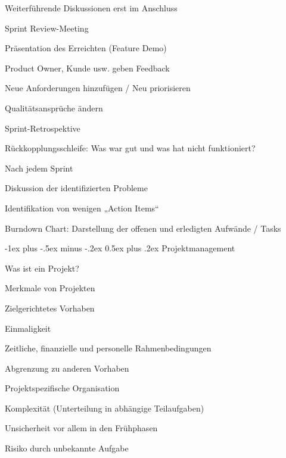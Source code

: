 \documentclass[a4paper]{article}
\makeatletter
\renewcommand{\section}{\@startsection{section}{1}{0mm}%
                                {-1ex plus -.5ex minus -.2ex}%
                                {0.5ex plus .2ex}%
                                {\normalfont\large\bfseries}}
\makeatother
\begin{document}
\begin{multicols}{3}
\begin{itemize*}
\begin{itemize*}
      \item Weiterführende Diskussionen erst im Anschluss
    \end{itemize*}
    \item Sprint Review-Meeting
    \begin{itemize*}
      \item Präsentation des Erreichten (Feature Demo)
      \item Product Owner, Kunde usw. geben Feedback
      \item Neue Anforderungen hinzufügen / Neu priorisieren
      \item Qualitätsansprüche ändern
    \end{itemize*}
    \item Sprint-Retrospektive
    \begin{itemize*}
      \item Rückkopplungsschleife: Was war gut und was hat nicht funktioniert?
      \item Nach jedem Sprint
      \item Diskussion der identifizierten Probleme
      \item Identifikation von wenigen „Action Items“
    \end{itemize*}
    \item Burndown Chart: Darstellung der offenen und erledigten Aufwände / Tasks
  \end{itemize*}

  \newpage
  \section{Projektmanagement}

  Was ist ein Projekt?
  \begin{itemize*}
    \item Merkmale von Projekten
    \begin{itemize*}
      \item Zielgerichtetes Vorhaben
      \item Einmaligkeit
      \item Zeitliche, finanzielle und personelle Rahmenbedingungen
      \item Abgrenzung zu anderen Vorhaben
      \item Projektspezifische Organisation
      \item Komplexität (Unterteilung in abhängige Teilaufgaben)
    \end{itemize*}
    \item Unsicherheit vor allem in den Frühphasen
    \item Risiko durch unbekannte Aufgabe
  \end{itemize*}


\end{multicols}
\end{document}
